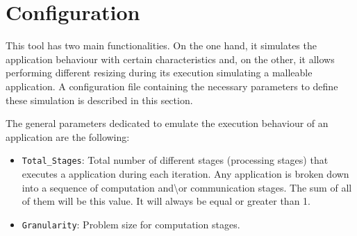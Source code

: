 \section{Configuration}
\label{subsection:configuration}
This tool has two main functionalities. On the one hand, it simulates the  application behaviour with certain characteristics  and, on the other, it allows performing different resizing during its execution simulating a malleable application. A configuration file containing the necessary parameters to define these simulation is described in this section. %


The general parameters dedicated to emulate the execution behaviour of an application are the following:
\begin{itemize}
    \item \texttt{Total\_Stages}: Total number of different stages (processing stages) that executes a application during each iteration. Any application is broken down into a sequence of computation  and\textbackslash or communication stages. The sum of all of them will be this value. It will always be equal  or greater than 1.
     \item \texttt{Granularity}: Problem size for  computation stages.%
\end{itemize}


